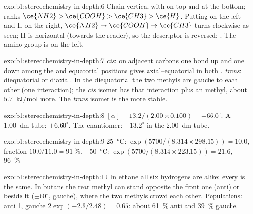 \begin{solution}{exo:b1:stereochemistry-in-depth:6}
Chain vertical with  on top and  at the bottom; ranks
$\ce{NH2} > \ce{COOH} > \ce{CH3} > \ce{H}$. Putting  on the left
and H on the right, $\ce{NH2} \to \ce{COOH} \to \ce{CH3}$ turns clockwise
as seen; H is horizontal (towards the reader), so the descriptor is
reversed: . The amino group is on the left.
\end{solution}

\begin{solution}{exo:b1:stereochemistry-in-depth:7}
\textit{cis}: on adjacent carbons one bond up and one down among the 
and equatorial positions gives axial--equatorial in both .
\textit{trans}: diequatorial or diaxial. In the diequatorial  the two
methyls are gauche to each other (one interaction); the \textit{cis}
isomer has that interaction plus an  methyl, about \qty{5.7}{kJ/mol}
more. The \textit{trans} isomer is the more stable.
\end{solution}

\begin{solution}{exo:b1:stereochemistry-in-depth:8}
$[\alpha] = 13.2/(2.00 \times 0.100) = +66.0^\circ$. A \qty{1.00}{dm} tube:
$+6.60^\circ$. The enantiomer: $-13.2^\circ$ in the \qty{2.00}{dm} tube.
\end{solution}

\begin{solution}{exo:b1:stereochemistry-in-depth:9}
\qty{25}{\celsius}: $\exp(5700/(8.314 \times 298.15)) = 10.0$, fraction
$10.0/11.0 = \qty{91}{\percent}$. \qty{-50}{\celsius}: $\exp(5700/(8.314
\times 223.15)) = 21.6$, \qty{96}{\percent}.
\end{solution}

\begin{solution}{exo:b1:stereochemistry-in-depth:10}
In ethane all six hydrogens are alike: every  is
the same. In butane the rear methyl can stand opposite the front one
(anti) or beside it ($\pm 60^\circ$, gauche), where the two methyls crowd
each other. Populations: anti 1, gauche $2\exp(-2.8/2.48) = 0.65$: about
\qty{61}{\percent} anti and \qty{39}{\percent} gauche.
\end{solution}

